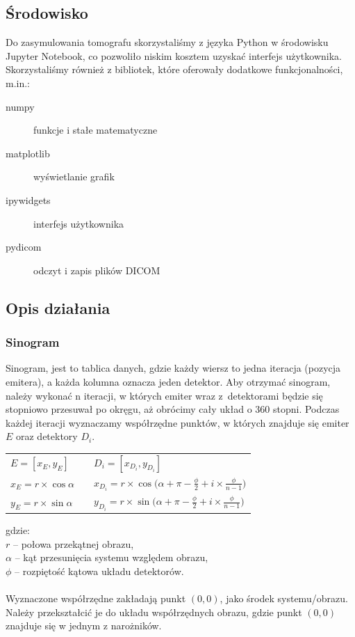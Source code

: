 \documentclass[polish,polish,a4paper]{article}
\begin{document}
		\subsection{Środowisko}
			Do zasymulowania tomografu skorzystaliśmy z języka Python w środowisku Jupyter Notebook,
			 co pozwoliło niskim kosztem uzyskać interfejs użytkownika.
			 Skorzystaliśmy również z bibliotek, które oferowały dodatkowe funkcjonalności, m.in.:
			
			\begin{description}
				\item[numpy] funkcje i stałe matematyczne
				\item[matplotlib] wyświetlanie grafik
				\item[ipywidgets] interfejs użytkownika
				\item[pydicom] odczyt i zapis plików DICOM
			\end{description}
			
			\subsection{Opis działania}
				\subsubsection{Sinogram}
				
				Sinogram, jest to tablica danych, 
				gdzie każdy wiersz to jedna iteracja (pozycja emitera), 
				a każda kolumna oznacza jeden detektor.
				Aby otrzymać sinogram, należy wykonać n iteracji, 
				w których emiter wraz z~detektorami będzie się stopniowo przesuwał po okręgu, 
				aż obrócimy cały układ o 360 stopni. 
				Podczas każdej iteracji wyznaczamy współrzędne punktów, w których znajduje się emiter $E$ oraz detektory $D_i$.
				\begin{center}
					\begin{tabular} {l l l}
						$ E = [ x_E, y_E ] $ 	& \hspace{2cm}	 &	$ D_i = [x_{D_i}, y_{D_i}] $
						\\
						$ x_E = r \times \cos{\alpha} $ 	& \hspace{2cm}	 &	 $ x_{D_i} = r \times \cos{\big(\alpha + \pi - \frac{\phi}{2} + i \times \frac{\phi}{n-1}\big)} $
						 \\ 
						$ y_E = r \times \sin{\alpha} $ 	& \hspace{2cm}	 &	 $ y_{D_i} =  r \times \sin{\big(\alpha + \pi - \frac{\phi}{2} + i \times \frac{\phi}{n-1}\big)}$ 
						\\
					\end{tabular}
				\end{center}
				gdzie: \\
				\indent $r$ -- połowa przekątnej obrazu, \\
				\indent $\alpha$ -- kąt przesunięcia systemu względem obrazu, \\
				\indent $\phi$ -- rozpiętość kątowa układu detektorów. \\ \\
				Wyznaczone współrzędne zakładają punkt $(0,0)$, jako środek systemu/obrazu.
				 Należy przekształcić je do układu współrzędnych obrazu,
				  gdzie punkt $(0,0)$ znajduje się w jednym z narożników.
				
\end{document}
